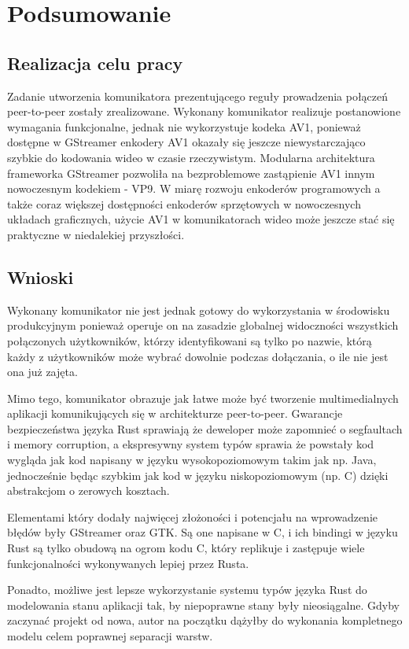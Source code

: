 \chapter{Podsumowanie}
\label{chap:podsumowanie}
\section{Realizacja celu pracy}

Zadanie utworzenia komunikatora prezentującego reguły prowadzenia połączeń peer-to-peer zostały
zrealizowane. Wykonany komunikator realizuje postanowione wymagania funkcjonalne, jednak nie
wykorzystuje kodeka AV1, ponieważ dostępne w GStreamer enkodery AV1 okazały się jeszcze
niewystarczająco szybkie do kodowania wideo w czasie rzeczywistym. Modularna architektura frameworka
GStreamer pozwoliła na bezproblemowe zastąpienie AV1 innym nowoczesnym kodekiem - VP9. W miarę
rozwoju enkoderów programowych a także coraz większej dostępności enkoderów sprzętowych w
nowoczesnych układach graficznych, użycie AV1 w komunikatorach wideo może jeszcze stać się
praktyczne w niedalekiej przyszłości.

\section{Wnioski}

Wykonany komunikator nie jest jednak gotowy do wykorzystania w środowisku produkcyjnym
ponieważ operuje on na zasadzie globalnej widoczności wszystkich połączonych użytkowników, którzy
identyfikowani są tylko po nazwie, którą każdy z użytkowników może wybrać dowolnie podczas
dołączania, o ile nie jest ona już zajęta.

Mimo tego, komunikator obrazuje jak łatwe może być tworzenie multimedialnych aplikacji
komunikujących się w architekturze peer-to-peer. Gwarancje bezpieczeństwa języka Rust sprawiają że
deweloper może zapomnieć o segfaultach i memory corruption, a ekspresywny system typów sprawia że
powstały kod wygląda jak kod napisany w języku wysokopoziomowym takim jak np. Java, jednocześnie
będąc szybkim jak kod w języku niskopoziomowym (np. C) dzięki abstrakcjom o zerowych kosztach.

Elementami który dodały najwięcej złożoności i potencjału na wprowadzenie błędów były GStreamer oraz
GTK. Są one napisane w C, i ich bindingi w języku Rust są tylko obudową na ogrom kodu C, który
replikuje i zastępuje wiele funkcjonalności wykonywanych lepiej przez Rusta.

Ponadto, możliwe jest lepsze wykorzystanie systemu typów języka Rust do modelowania stanu aplikacji
tak, by niepoprawne stany były nieosiągalne. Gdyby zaczynać projekt od nowa, autor na początku
dążyłby do wykonania kompletnego modelu celem poprawnej separacji warstw.

